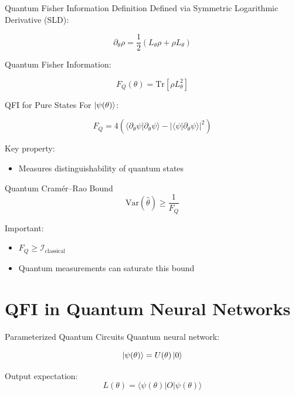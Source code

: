 \documentclass{beamer}
\begin{document}
\begin{frame}{Quantum Fisher Information Definition}
Defined via Symmetric Logarithmic Derivative (SLD):

\[
\partial_\theta \rho 
= \frac{1}{2}(L_\theta \rho + \rho L_\theta)
\]

\pause

Quantum Fisher Information:

\[
F_Q(\theta) = \mathrm{Tr}[\rho L_\theta^2]
\]

\end{frame}

\begin{frame}{QFI for Pure States}
For $\ket{\psi(\theta)}$:

\[
F_Q = 4 \left(
\langle \partial_\theta \psi | \partial_\theta \psi \rangle
- |\langle \psi | \partial_\theta \psi \rangle|^2
\right)
\]

\pause

Key property:
\begin{itemize}
\item Measures distinguishability of quantum states
\end{itemize}

\end{frame}

\begin{frame}{Quantum Cramér–Rao Bound}
\[
\mathrm{Var}(\hat{\theta}) \geq \frac{1}{F_Q}
\]

\pause

Important:
\begin{itemize}
\item $F_Q \geq \mathcal{I}_{\text{classical}}$
\item Quantum measurements can saturate this bound
\end{itemize}

\end{frame}

\section{QFI in Quantum Neural Networks}

\begin{frame}{Parameterized Quantum Circuits}
Quantum neural network:

\[
\ket{\psi(\theta)} = U(\theta)\ket{0}
\]

\pause

Output expectation:
\[
L(\theta) = \langle \psi(\theta) | O | \psi(\theta) \rangle
\]

\end{frame}
\end{document}
